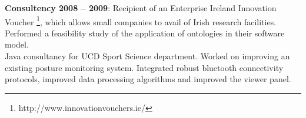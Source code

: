 \documentclass[11pt]{article}
\begin{document}
\textbf{Consultency 2008 -- 2009}: Recipient of an Enterprise Ireland Innovation Voucher
\footnote{http://www.innovationvouchers.ie/}, which allows small companies to
avail of Irish research facilities. Performed a feasibility study of the
application of ontologies in their software model.\\

Java consultancy for UCD Sport Science department. Worked on
improving an existing posture monitoring system. Integrated robust bluetooth 
connectivity protocols, improved data processing algorithms and
improved the viewer panel.

%
%
%
%

%
%
%
%
%
%
\end{document}
